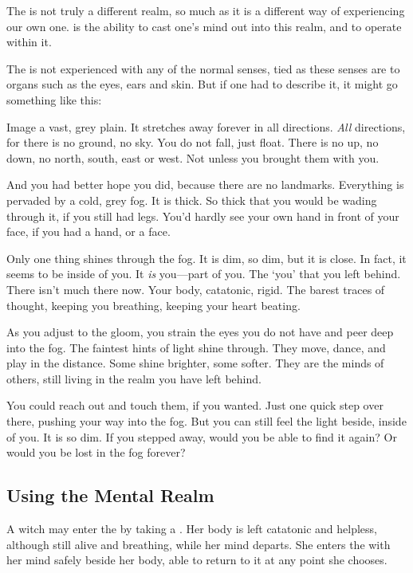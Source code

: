 The {\mentalrealm} is not truly a different realm, so much as it is a different way of experiencing our own one.
 is the ability to cast one's mind out into this realm, and to operate within it.

The {\mentalrealm} is not experienced with any of the normal senses, tied as these senses are to organs such as the eyes, ears and skin.
But if one had to describe it, it might go something like this:

Image a vast, grey plain.
It stretches away forever in all directions.
\emph{All} directions, for there is no ground, no sky.
You do not fall, just float.
There is no up, no down, no north, south, east or west.
Not unless you brought them with you.

And you had better hope you did, because there are no landmarks.
Everything is pervaded by a cold, grey fog.
It is thick.
So thick that you would be wading through it, if you still had legs.
You'd hardly see your own hand in front of your face, if you had a hand, or a face.

Only one thing shines through the fog.
It is dim, so dim, but it is close.
In fact, it seems to be inside of you.
It \emph{is} you---part of you.
The `you' that you left behind.
There isn't much there now.
Your body, catatonic, rigid.
The barest traces of thought, keeping you breathing, keeping your heart beating.

As you adjust to the gloom, you strain the eyes you do not have and peer deep into the fog.
The faintest hints of light shine through.
They move, dance, and play in the distance.
Some shine brighter, some softer.
They are the minds of others, still living in the realm you have left behind.

You could reach out and touch them, if you wanted.
Just one quick step over there, pushing your way into the fog.
But you can still feel the light beside, inside of you.
It is so dim.
If you stepped away, would you be able to find it again?
Or would you be lost in the fog forever?

\subsection{Using the Mental Realm}

A witch may enter the {\mentalrealm} by taking a .
Her body is left catatonic and helpless, although still alive and breathing, while her mind departs.
She enters the {\mentalrealm} with her mind safely beside her body, able to return to it at any point she chooses.

